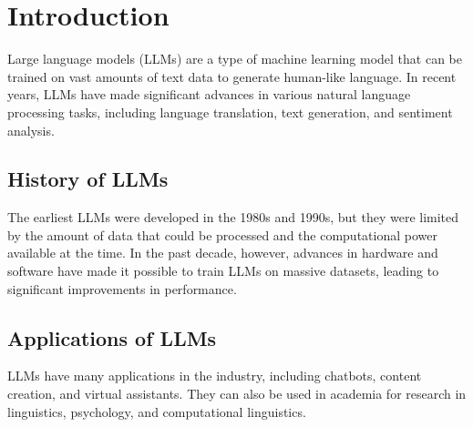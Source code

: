 \documentclass{article}
\begin{document}
    \maketitle

    \section{Introduction}

    Large language models (LLMs) are a type of machine learning model that can be trained on vast amounts of text data to generate human-like language. In recent years, LLMs have made significant advances in various natural language processing tasks, including language translation, text generation, and sentiment analysis.

    \subsection{History of LLMs}

The earliest LLMs were developed in the 1980s and 1990s, but they were limited by the amount of data that could be processed and the computational power available at the time. In the past decade, however, advances in hardware and software have made it possible to train LLMs on massive datasets, leading to significant improvements in performance.

\subsection{Applications of LLMs}

LLMs have many applications in the industry, including chatbots, content creation, and virtual assistants. They can also be used in academia for research in linguistics, psychology, and computational linguistics.
\end{document}
